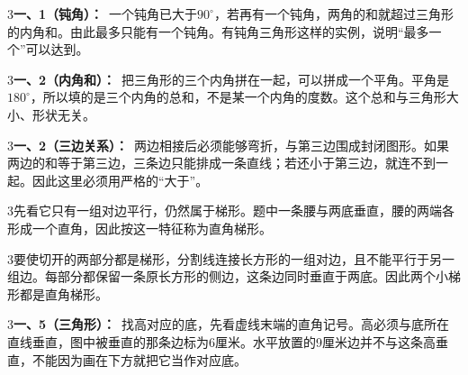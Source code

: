 \documentclass[multi=snippet,border={5bp 20bp 5bp 5bp}]{standalone}
\newenvironment{snippet}[3]{\begin{minipage}{#1bp}\color{answerred}\fontsize{#2}{#3}\selectfont\raggedright}{\end{minipage}}
\begin{document}
\begin{snippet}{505}{11.5}{14}\begin{multicols}{3}\raggedcolumns \textbf{一、1（钝角）：}\ 一个钝角已大于\(90^\circ\)\allowbreak ，若再有一个钝角，两角的和就超过三角形的内角和。由此最多只能有一个钝角。有钝角三角形这样的实例，说明“最多一个”可以达到。\end{multicols}\end{snippet}
\begin{snippet}{505}{11.5}{14}\begin{multicols}{3}\raggedcolumns \textbf{一、2（内角和）：}\ 把三角形的三个内角拼在一起，可以拼成一个平角。平角是\(180^\circ\)\allowbreak ，所以填的是三个内角的总和，不是某一个内角的度数。这个总和与三角形大小、形状无关。\end{multicols}\end{snippet}
\begin{snippet}{505}{11.5}{14}\begin{multicols}{3}\raggedcolumns \textbf{一、2（三边关系）：}\ 两边相接后必须能够弯折，与第三边围成封闭图形。如果两边的和等于第三边，三条边只能排成一条直线；若还小于第三边，就连不到一起。因此这里必须用严格的“大于”。\end{multicols}\end{snippet}
\begin{snippet}{505}{11.5}{14}\begin{multicols}{3}\raggedcolumns 先看它只有一组对边平行，仍然属于梯形。题中一条腰与两底垂直，腰的两端各形成一个直角，因此按这一特征称为直角梯形。\end{multicols}\end{snippet}
\begin{snippet}{505}{11.5}{14}\begin{multicols}{3}\raggedcolumns 要使切开的两部分都是梯形，分割线连接长方形的一组对边，且不能平行于另一组边。每部分都保留一条原长方形的侧边，这条边同时垂直于两底。因此两个小梯形都是直角梯形。\end{multicols}\end{snippet}
\begin{snippet}{505}{11.5}{14}\begin{multicols}{3}\raggedcolumns \textbf{一、5（三角形）：}\ 找高对应的底，先看虚线末端的直角记号。高必须与底所在直线垂直，图中被垂直的那条边标为6厘米。水平放置的9厘米边并不与这条高垂直，不能因为画在下方就把它当作对应底。\end{multicols}\end{snippet}
\end{document}
